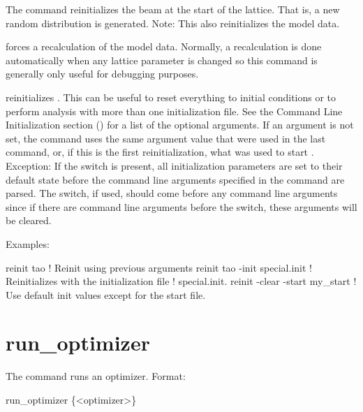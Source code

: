 \vskip 10pt 

The  command reinitializes the beam at the start of the lattice. That is, a
new random distribution is generated.  Note: This also reinitializes the model data.

 forces a recalculation of the model data.  Normally, a recalculation is done
automatically when any lattice parameter is changed so this command is generally only useful for
debugging purposes.

 reinitializes \tao. This can be useful to reset everything to initial
conditions or to perform analysis with more than one initialization file. See the Command Line
Initialization section () for a list of the optional arguments. If an argument
is not set, the  command uses the same argument value that were used in the last
 command, or, if this is the first reinitialization, what was used to start \tao.
Exception: If the  switch is present, all initialization parameters are set to their
default state before the command line arguments specified in the  command are
parsed. The  switch, if used, should come before any command line arguments since if
there are command line arguments before the  switch, these arguments will be cleared.

Examples:
\begin{example}
  reinit tao                         ! Reinit using previous arguments
  reinit tao -init special.init      ! Reinitializes \tao with the initialization file 
                                     !   special.init.
  reinit -clear -start my_start      ! Use default init values except for the start file.                    
\end{example}


\section{run_optimizer}
\label{s:run}

The  command runs an optimizer. Format:
\begin{example}
  run_optimizer \{<optimizer>\}
\end{example}

\vskip 10pt 

